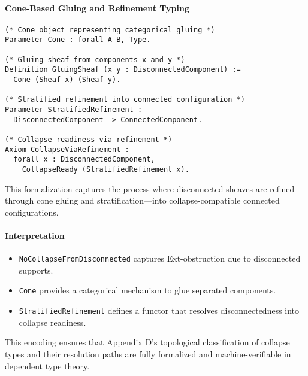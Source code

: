 \documentclass[11pt]{article}
\begin{document}
{\paragraph{Cone-Based Gluing and Refinement Typing}

\begin{lstlisting}[language=Coq]
(* Cone object representing categorical gluing *)
Parameter Cone : forall A B, Type.

(* Gluing sheaf from components x and y *)
Definition GluingSheaf (x y : DisconnectedComponent) :=
  Cone (Sheaf x) (Sheaf y).

(* Stratified refinement into connected configuration *)
Parameter StratifiedRefinement :
  DisconnectedComponent -> ConnectedComponent.

(* Collapse readiness via refinement *)
Axiom CollapseViaRefinement :
  forall x : DisconnectedComponent,
    CollapseReady (StratifiedRefinement x).
\end{lstlisting}

This formalization captures the process where disconnected sheaves are refined—through cone gluing  
and stratification—into collapse-compatible connected configurations.

\paragraph{Interpretation}

\begin{itemize}
  \item \texttt{NoCollapseFromDisconnected} captures Ext-obstruction due to disconnected supports.
  \item \texttt{Cone} provides a categorical mechanism to glue separated components.
  \item \texttt{StratifiedRefinement} defines a functor that resolves disconnectedness into collapse readiness.
\end{itemize}

This encoding ensures that Appendix D's topological classification of collapse types and their  
resolution paths are fully formalized and machine-verifiable in dependent type theory.

\begin{center}
\end{center}

}
\end{document}
